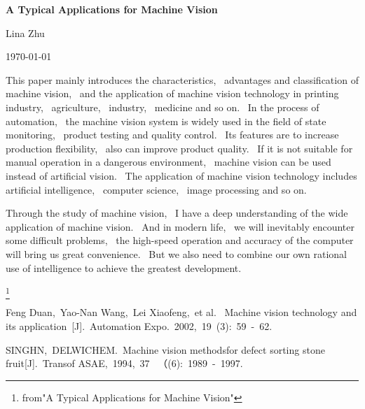 \documentclass{article}
\begin{document}
	\begin{center}
	
		 {\bfseries \LARGE A Typical Applications for Machine Vision} 
		  
	\end{center}
	\begin{center}
		Lina Zhu
	\end{center}
	\begin{center}
		\today
	\end{center}
	
	\par This paper mainly introduces the characteristics, ~advantages and classification of machine vision,~ 
	and the application of machine vision technology in printing industry,~ agriculture,~ industry, ~medicine 
	and so on. ~In the process of automation,~ the machine vision system is widely used in the field of state
	 monitoring,~ product testing and quality control.~ Its features are to increase production flexibility,~
	  also can improve product quality.~ If it is not suitable for manual operation in a dangerous environment,~
	   machine vision can be used instead of artificial vision.~ The application of machine vision technology
	    includes artificial intelligence, ~computer science,~ image processing and so on.
	\par Through the study of machine vision,~ I have a deep understanding of the wide application of machine 
	vision.~ And in modern life,~ we will inevitably encounter some difficult problems,~ the high-speed operation 
	and accuracy of the computer will bring us great convenience.~ But we also need to combine our own rational
	 use of intelligence to achieve the greatest development.
	
	\footnote{from"A Typical Applications for Machine Vision"}
	      
	\begin{thebibliography}{99}
		   Feng Duan,~Yao-Nan Wang,~Lei Xiaofeng,~et al.~ 
		Machine vision technology and its application~[J].~Automation Expo.~2002,~19~(3):~59~-~62.

	   SINGHN,~DELWICHEM.~Machine vision methodsfor defect sorting stone fruit[J].~Transof ASAE,~1994,~37 ~（(6):~1989~-~1997.
\end{thebibliography}
\end{document}
